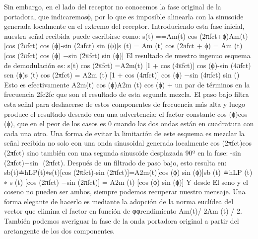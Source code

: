 Sin embargo, en el lado del receptor no conocemos la fase original de la portadora, que indicaremosϕ, por lo que es imposible alinearla con la sinusoide generada localmente en el extremo del receptor. Introduciendo esta fase inicial, nuestra señal recibida puede escribirse como:
s(t) ==Am(t) cos (2πfct+ϕ)Am(t) [cos (2πfct) cos (ϕ)-sin (2πfct) sin (ϕ)]s (t) = Am (t) cos⁡ (2πfct + ϕ) = Am (t) [cos⁡ (2πfct) cos⁡ (ϕ) −sin⁡ (2πfct) sin⁡ (ϕ)]
El resultado de nuestro ingenuo esquema de demodulación es:
s(t) cos (2πfct) =A2m(t) {[1 + cos (4πfct)] cos (ϕ)-sin (4πfct) sen (ϕ)}s (t) cos⁡ (2πfct) = A2m (t) {[1 + cos⁡ (4πfct)] cos⁡ (ϕ) −sin⁡ (4πfct) sin⁡ ()}
Esto es efectivamente A2m(t) cos (ϕ)A2m (t) cos⁡ (ϕ) + un par de términos en la frecuencia 2fc2fc que son el resultado de esta segunda mezcla. El paso bajo filtra esta señal para deshacerse de estos componentes de frecuencia más alta y luego produce el resultado deseado con una advertencia: el factor constante cos (ϕ)cos⁡ (ϕ), que en el peor de los casos es 0 cuando las dos ondas están en cuadratura con cada una otro.
Una forma de evitar la limitación de este esquema es mezclar la señal recibida no solo con una onda sinusoidal generada localmente cos (2πfct)cos⁡ (2πfct) sino también con una segunda sinusoide desplazada 90º en la fase: -sin (2πfct)−sin ⁡ (2πfct). Después de un filtrado de paso bajo, esto resulta en: 
sb(t)≐hLP(t)∗s(t)[cos (2πfct)-sin (2πfct)]=A2m(t)[cos (ϕ) sin (ϕ)]sb (t) ≐hLP (t) ∗ s (t) [cos⁡ (2πfct) −sin⁡ (2πfct)] = A2m (t) [cos⁡ (ϕ) sin⁡ (ϕ)]
Y desde El seno y el coseno no pueden ser ambos, siempre podemos recuperar nuestro mensaje. Una forma elegante de hacerlo es mediante la adopción de la norma euclídea del vector que elimina el factor en función de φφrendimiento Am(t)/ 2Am (t) / 2. También podemos averiguar la fase de la onda portadora original a partir del arctangente de los dos componentes.


